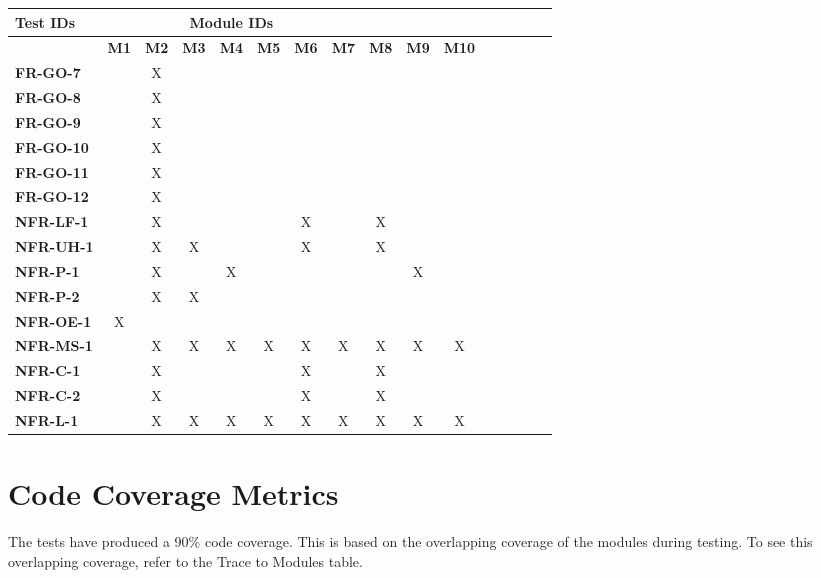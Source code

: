 \documentclass[12pt, titlepage]{article}
\begin{document}
\begin{table}[H]
    \centering
    \begin{adjustbox}{max width=0.7\paperwidth}
    \begin{tabular}{l|ccccccccccccccc}
        \textbf{Test IDs} & \multicolumn{7}{c}{\textbf{Module IDs}}\\
        \hline
        ~ & \textbf{M1} & \textbf{M2} & \textbf{M3} & \textbf{M4} & \textbf{M5} & \textbf{M6} & \textbf{M7} & \textbf{M8} & \textbf{M9} & \textbf{M10}\\
        \textbf{FR-GO-7}   & ~ & X & ~ & ~ & ~ & ~ & ~ & ~ & ~ & ~\\
        \textbf{FR-GO-8}   & ~ & X & ~ & ~ & ~ & ~ & ~ & ~ & ~ & ~\\
        \textbf{FR-GO-9}   & ~ & X & ~ & ~ & ~ & ~ & ~ & ~ & ~ & ~\\
        \textbf{FR-GO-10}  & ~ & X & ~ & ~ & ~ & ~ & ~ & ~ & ~ & ~\\
        \textbf{FR-GO-11}  & ~ & X & ~ & ~ & ~ & ~ & ~ & ~ & ~ & ~\\
        \textbf{FR-GO-12}  & ~ & X & ~ & ~ & ~ & ~ & ~ & ~ & ~ & ~\\
        \textbf{NFR-LF-1}  & ~ & X & ~ & ~ & ~ & X & ~ & X & ~ & ~ \\
        \textbf{NFR-UH-1}  & ~ & X & X & ~ & ~ & X & ~ & X & ~ & ~\\
        \textbf{NFR-P-1}   & ~ & X & ~ & X & ~ & ~ & ~ & ~ & X & ~\\
        \textbf{NFR-P-2}   & ~ & X & X & ~ & ~ & ~ & ~ & ~ & ~ & ~\\
        \textbf{NFR-OE-1}  & X & ~ & ~ & ~ & ~ & ~ & ~ & ~ & ~ & ~\\
        \textbf{NFR-MS-1}  & ~ & X & X & X & X & X & X & X & X & X\\
        \textbf{NFR-C-1}   & ~ & X & ~ & ~ & ~ & X & ~ & X & ~ & ~ \\
        \textbf{NFR-C-2}   & ~ & X & ~ & ~ & ~ & X & ~ & X & ~ & ~ \\
        \textbf{NFR-L-1}   & ~ & X & X & X & X & X & X & X & X & X\\
    \end{tabular}
    \end{adjustbox}
    \label{Traceability Matrix: Non-Functional Requirement}
\end{table}

\section{Code Coverage Metrics}
The tests have produced a 90\% code coverage. This is based on the overlapping coverage of the modules during testing. To see this overlapping coverage, refer to the Trace to Modules table.




\end{document}
